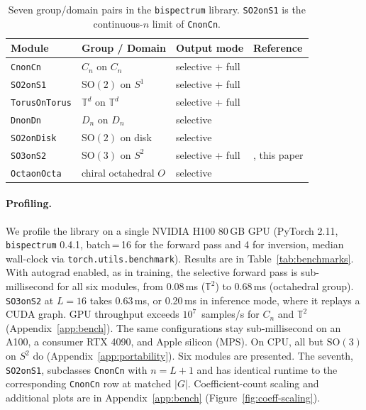 \documentclass{article}
\theoremstyle{definition}
\theoremstyle{remark}
\newcommand{\SO}{\mathrm{SO}}
\theoremstyle{definition}
\begin{document}
\begin{table}[tbp]
  \caption{Seven group/domain pairs in the \texttt{bispectrum} library.
    \texttt{SO2onS1} is the continuous-$n$ limit of \texttt{CnonCn}.}
  \label{tab:supported-groups}
  \centering
  \small
  \begin{tabular*}{\linewidth}{@{\extracolsep{\fill}}llll@{}}
    \toprule
    Module & Group / Domain & Output mode & Reference \\
    \midrule
    \texttt{CnonCn} & $C_n$ on $C_n$ & selective + full & \citep{giannakis1989bispectrum} \\
    \texttt{SO2onS1} & $\SO(2)$ on $S^1$ & selective + full & \citep{mataigne2024selective} \\
    \texttt{TorusOnTorus} & $\mathbb{T}^d$ on $\mathbb{T}^d$ & selective + full & \citep{mataigne2024selective} \\
    \texttt{DnonDn} & $D_n$ on $D_n$ & selective & \citep{mataigne2024selective} \\
    \texttt{SO2onDisk} & $\SO(2)$ on disk & selective & \citep{myers2025selective} \\
    \texttt{SO3onS2} & $\SO(3)$ on $S^2$ & selective + full & \citep{kakarala2012bispectrum}, this paper \\
    \texttt{OctaonOcta} & chiral octahedral $O$ & selective & \citep{mataigne2024selective} \\
    \bottomrule
  \end{tabular*}
\end{table}



\paragraph{Profiling.} \label{sec:benchmarks} We profile the library on a single NVIDIA H100 80\,GB GPU
(PyTorch 2.11, \texttt{bispectrum} 0.4.1, batch\,=\,16 for the forward pass and 4 for inversion,
median wall-clock via \texttt{torch.utils.benchmark}). Results are in
Table~\ref{tab:benchmarks}.
With autograd enabled, as in training, the selective forward pass is sub-millisecond for all six modules,
from 0.08\,ms ($\mathbb{T}^2$) to 0.68\,ms (octahedral group). \texttt{SO3onS2} at $L{=}16$
takes 0.63\,ms, or 0.20\,ms in inference mode, where it replays a CUDA graph.
GPU throughput exceeds $10^7$~samples/s for $C_n$ and $\mathbb{T}^2$
(Appendix~\ref{app:bench}). The same configurations stay sub-millisecond on an A100, a consumer RTX 4090,
and Apple silicon (MPS). On CPU, all but $\mathrm{SO}(3)$ on $S^2$ do
(Appendix~\ref{app:portability}). Six modules are presented. The seventh,
\texttt{SO2onS1}, subclasses \texttt{CnonCn} with $n = L{+}1$ and has
identical runtime to the corresponding \texttt{CnonCn} row at matched
$|G|$. Coefficient-count scaling and additional plots are in
Appendix~\ref{app:bench} (Figure~\ref{fig:coeff-scaling}).
\end{document}
